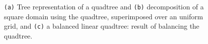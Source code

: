 \begin{figure}
  \begin{center}
    \caption{{\tt(a)} Tree representation of a quadtree and {\tt(b)}
    decomposition of a square domain using the quadtree, superimposed
    over an uniform grid, and {\tt(c)} a balanced linear quadtree:
    result of balancing the quadtree.}
  \end{center}
\end{figure}

